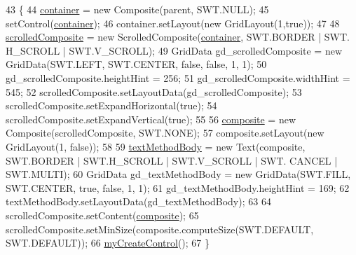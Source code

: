 \begin{DoxyCode}
43                                                 \{
44         \hyperlink{classit_1_1isislab_1_1masonassisteddocumentation_1_1mason_1_1wizards_1_1_l___step_method_page_ab20403475340d7e5a95cdb4a1f9e0b3c}{container} = \textcolor{keyword}{new} Composite(parent, SWT.NULL);
45         setControl(\hyperlink{classit_1_1isislab_1_1masonassisteddocumentation_1_1mason_1_1wizards_1_1_l___step_method_page_ab20403475340d7e5a95cdb4a1f9e0b3c}{container});
46         container.setLayout(\textcolor{keyword}{new} GridLayout(1,\textcolor{keyword}{true}));
47         
48         \hyperlink{classit_1_1isislab_1_1masonassisteddocumentation_1_1mason_1_1wizards_1_1_l___step_method_page_a318f8c83456bbb4b81cc63dff370bf7b}{scrolledComposite} = \textcolor{keyword}{new} ScrolledComposite(\hyperlink{classit_1_1isislab_1_1masonassisteddocumentation_1_1mason_1_1wizards_1_1_l___step_method_page_ab20403475340d7e5a95cdb4a1f9e0b3c}{container}, SWT.BORDER | SWT.
      H\_SCROLL | SWT.V\_SCROLL);
49         GridData gd\_scrolledComposite = \textcolor{keyword}{new} GridData(SWT.LEFT, SWT.CENTER, \textcolor{keyword}{false}, \textcolor{keyword}{false}, 1, 1);
50         gd\_scrolledComposite.heightHint = 256;
51         gd\_scrolledComposite.widthHint = 545;
52         scrolledComposite.setLayoutData(gd\_scrolledComposite);
53         scrolledComposite.setExpandHorizontal(\textcolor{keyword}{true});
54         scrolledComposite.setExpandVertical(\textcolor{keyword}{true});
55         
56         \hyperlink{classit_1_1isislab_1_1masonassisteddocumentation_1_1mason_1_1wizards_1_1_l___step_method_page_ad8812271bc4da1c3b7d4e415d45e875d}{composite} = \textcolor{keyword}{new} Composite(scrolledComposite, SWT.NONE);
57         composite.setLayout(\textcolor{keyword}{new} GridLayout(1, \textcolor{keyword}{false}));
58         
59         \hyperlink{classit_1_1isislab_1_1masonassisteddocumentation_1_1mason_1_1wizards_1_1_l___step_method_page_a1a505af315bac0ab33bc17ae6f9f5d76}{textMethodBody} = \textcolor{keyword}{new} Text(composite, SWT.BORDER | SWT.H\_SCROLL | SWT.V\_SCROLL | SWT.
      CANCEL | SWT.MULTI);
60         GridData gd\_textMethodBody = \textcolor{keyword}{new} GridData(SWT.FILL, SWT.CENTER, \textcolor{keyword}{true}, \textcolor{keyword}{false}, 1, 1);
61         gd\_textMethodBody.heightHint = 169;
62         textMethodBody.setLayoutData(gd\_textMethodBody);        
63         
64         scrolledComposite.setContent(\hyperlink{classit_1_1isislab_1_1masonassisteddocumentation_1_1mason_1_1wizards_1_1_l___step_method_page_ad8812271bc4da1c3b7d4e415d45e875d}{composite});
65         scrolledComposite.setMinSize(composite.computeSize(SWT.DEFAULT, SWT.DEFAULT));
66         \hyperlink{classit_1_1isislab_1_1masonassisteddocumentation_1_1mason_1_1wizards_1_1_l___step_method_page_a5b1bfbacb4409e90ff72c3739e989672}{myCreateControl}();
67     \}
\end{DoxyCode}


